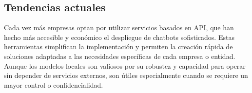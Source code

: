 \subsection{Tendencias actuales}
Cada vez más empresas optan por utilizar servicios basados en API, que han hecho más accesible y económico el despliegue de chatbots sofisticados. Estas herramientas simplifican la implementación y permiten la creación rápida de soluciones adaptadas a las necesidades específicas de cada empresa o entidad. Aunque los modelos locales son valiosos por su robustez y capacidad para operar sin depender de servicios externos, son útiles especialmente cuando se requiere un mayor control o confidencialidad.


 